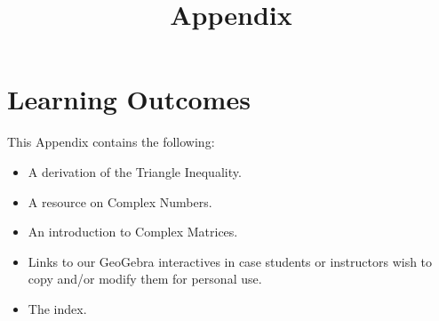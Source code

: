\documentclass{ximera}
\title{Appendix}
\begin{document}
\begin{abstract}

\end{abstract}
 
\maketitle
 
\section*{Learning Outcomes}
This Appendix contains the following:
 
\begin{itemize}
    \item A derivation of the Triangle Inequality.
    \item A resource on Complex Numbers.
    \item An introduction to Complex Matrices.
    \item Links to our GeoGebra interactives in case students or instructors wish to copy and/or modify them for personal use.
    \item The index.  
\end{itemize}

 
\end{document}
